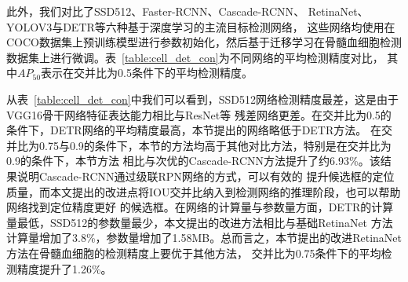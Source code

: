 此外，我们对比了SSD512\cite{liu2016ssd}、Faster-RCNN\cite{ren2015faster}、Cascade-RCNN\cite{cai2018cascade}、
RetinaNet\cite{lin2017focal}、YOLOV3\cite{redmon2018yolov3}与DETR\cite{zhu2020deformable}等六种基于深度学习的主流目标检测网络，
这些网络均使用在COCO数据集上预训练模型进行参数初始化，然后基于迁移学习在骨髓血细胞检测数据集上进行微调。表~\ref{table:cell_det_con}为不同网络的平均检测精度对比，
其中$AP_{50}$表示在交并比为0.5条件下的平均检测精度。

从表~\ref{table:cell_det_con}中我们可以看到，SSD512网络检测精度最差，这是由于VGG16骨干网络特征表达能力相比与ResNet等
残差网络更差。在交并比为0.5的条件下，DETR网络的平均精度最高，本节提出的网络略低于DETR方法。
在交并比为0.75与0.9的条件下，本节的方法均高于其他对比方法，特别是在交并比为0.9的条件下，本节方法 
相比与次优的Cascade-RCNN方法提升了约6.93\%。该结果说明Cascade-RCNN通过级联RPN网络的方式，可以有效的
提升候选框的定位质量，而本文提出的改进点将IOU交并比纳入到检测网络的推理阶段，也可以帮助网络找到定位精度更好
的候选框。在网络的计算量与参数量方面，DETR的计算量最低，SSD512的参数量最少，本文提出的改进方法相比与基础RetinaNet
方法计算量增加了3.8\%，参数量增加了1.58MB。总而言之，本节提出的改进RetinaNet方法在骨髓血细胞的检测精度上要优于其他方法，
交并比为0.75条件下的平均检测精度提升了1.26\%。

